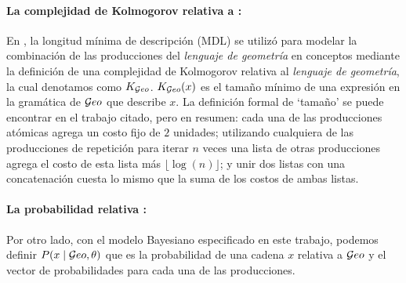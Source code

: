 \paragraph{La complejidad de Kolmogorov relativa a \boldmath{$\geom$}:}

En \cite{marie2016}, la longitud mínima de descripción (MDL) se utilizó para modelar la combinación de las producciones del \textit{lenguaje de geometría} en conceptos mediante la definición de una complejidad de Kolmogorov relativa al {\em lenguaje de geometría}, la cual denotamos como $K_{\mathcal Geo}$. $K_{\mathcal Geo}(x)$ es el tamaño mínimo de una expresión en la gramática de $\geom$ que describe $x$. La definición formal de `tamaño' se puede encontrar en el trabajo citado, pero en resumen: cada una de las producciones atómicas agrega un costo fijo de $2$ unidades; utilizando cualquiera de las producciones de repetición para iterar $n$ veces una lista de otras producciones agrega el costo de esta lista más $\lfloor \log(n) \rfloor$; y unir dos listas con una concatenación cuesta lo mismo que la suma de los costos de ambas listas.


\paragraph{La probabilidad relativa \boldmath{$\geom$}:} Por otro lado, con el modelo Bayesiano especificado en este trabajo, podemos definir $P(x \mid \mathcal Geo, \theta)$ que es la probabilidad de una cadena $x$ relativa a $\geom$ y el vector de probabilidades para cada una de las producciones.


